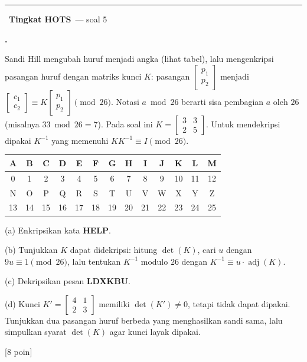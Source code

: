 \documentclass[a4paper,11pt]{article}
\newcommand{\adj}{\operatorname{adj}}
\renewcommand{\arraystretch}{1.35}
\newcounter{no}
\newcommand{\tingkat}[2]{\par\Needspace{7\baselineskip}\vspace{0.6em}\noindent
  {\color{accc}\rule{3pt}{1.1em}}\ {\color{mainc}\bfseries #1}\ {\small\color{gray}--- #2}\par\vspace{0.1em}}
\newcommand{\soal}[2]{\par\vspace{0.75em}\stepcounter{no}\noindent
  \begin{minipage}[t]{1.8em}\textbf{\theno.}\end{minipage}%
  \begin{minipage}[t]{\dimexpr\linewidth-1.8em\relax}#1\par\vspace{0.35em}#2\end{minipage}\par}
\newcommand{\poin}[1]{\hfill{\small\color{mainc}[#1 poin]}}
\begin{document}
\tingkat{Tingkat HOTS}{soal 5}
\soal{Sandi Hill mengubah huruf menjadi angka (lihat tabel), lalu mengenkripsi pasangan huruf dengan matriks kunci $K$: pasangan $\begin{bmatrix}p_1\\p_2\end{bmatrix}$ menjadi $\begin{bmatrix}c_1\\c_2\end{bmatrix}\equiv K\begin{bmatrix}p_1\\p_2\end{bmatrix}\pmod{26}$. Notasi $a\bmod 26$ berarti sisa pembagian $a$ oleh $26$ (misalnya $33\bmod26=7$). Pada soal ini $K=\begin{bmatrix}3&3\\2&5\end{bmatrix}$. Untuk mendekripsi dipakai $K^{-1}$ yang memenuhi $KK^{-1}\equiv I\pmod{26}$.\par\smallskip
\begin{center}\small\renewcommand{\arraystretch}{1.1}\setlength{\tabcolsep}{3pt}
\begin{tabular}{|*{13}{c|}}\hline
A&B&C&D&E&F&G&H&I&J&K&L&M\\\hline
0&1&2&3&4&5&6&7&8&9&10&11&12\\\hline\hline
N&O&P&Q&R&S&T&U&V&W&X&Y&Z\\\hline
13&14&15&16&17&18&19&20&21&22&23&24&25\\\hline
\end{tabular}\end{center}\vspace{-0.3em}
(a) Enkripsikan kata \textbf{HELP}.\par
(b) Tunjukkan $K$ dapat didekripsi: hitung $\det(K)$, cari $u$ dengan $9u\equiv1\pmod{26}$, lalu tentukan $K^{-1}$ modulo $26$ dengan $K^{-1}\equiv u\cdot\adj(K)$.\par
(c) Dekripsikan pesan \textbf{LDXKBU}.\par
(d) Kunci $K'=\begin{bmatrix}4&1\\2&3\end{bmatrix}$ memiliki $\det(K')\neq0$, tetapi tidak dapat dipakai. Tunjukkan dua pasangan huruf berbeda yang menghasilkan sandi sama, lalu simpulkan syarat $\det(K)$ agar kunci layak dipakai.}{\poin{8}}
\end{document}
